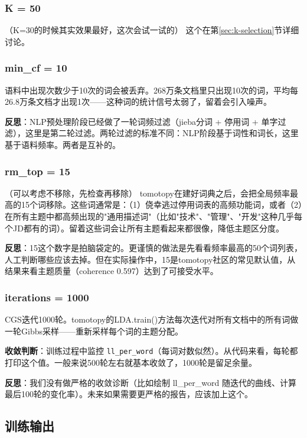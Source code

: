 \documentclass[12pt,a4paper]{ctexart}
\begin{document}
\subsubsection{K = 50}
（K=30的时候其实效果最好，这次会试一试的）
这个在第\ref{sec:k-selection}节详细讨论。
\subsubsection{min\_cf = 10}

语料中出现次数少于10次的词会被丢弃。268万条文档里只出现10次的词，平均每26.8万条文档才出现1次——这种词的统计信号太弱了，留着会引入噪声。

\textbf{反思}：NLP预处理阶段已经做了一轮词频过滤（jieba分词 + 停用词 + 单字过滤），这里是第二轮过滤。两轮过滤的标准不同：NLP阶段基于词性和词长，这里基于语料频率。两者是互补的。

\subsubsection{rm\_top = 15}
（可以考虑不移除，先检查再移除）
tomotopy在建好词典之后，会把全局频率最高的15个词移除。这些词通常是：（1）侥幸逃过停用词表的高频功能词，或者（2）在所有主题中都高频出现的"通用描述词"（比如"技术"、"管理"、"开发"这种几乎每个JD都有的词）。留着这些词会让所有主题看起来都很像，降低主题区分度。

\textbf{反思}：15这个数字是拍脑袋定的。更谨慎的做法是先看看频率最高的50个词列表，人工判断哪些应该去掉。但在实际操作中，15是tomotopy社区的常见默认值，从结果来看主题质量（coherence 0.597）达到了可接受水平。

\subsubsection{iterations = 1000}

CGS迭代1000轮。tomotopy的LDA.train()方法每次迭代对所有文档中的所有词做一轮Gibbs采样——重新采样每个词的主题分配。

\textbf{收敛判断}：训练过程中监控 \texttt{ll\_per\_word}（每词对数似然）。从代码来看，每轮都打印这个值。一般来说500轮左右就基本收敛了，1000轮是留足余量。

\textbf{反思}：我们没有做严格的收敛诊断（比如绘制 ll\_per\_word 随迭代的曲线、计算最后100轮的变化率）。未来如果需要更严格的报告，应该加上这个。

\subsection{训练输出}
\end{document}
